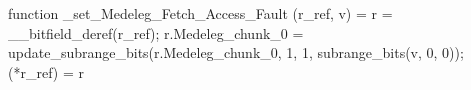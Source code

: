 function _set_Medeleg_Fetch_Access_Fault (r_ref, v) = {
    r = __bitfield_deref(r_ref);
    r.Medeleg_chunk_0 = update_subrange_bits(r.Medeleg_chunk_0, 1, 1, subrange_bits(v, 0, 0));
    (*r_ref) = r
}
